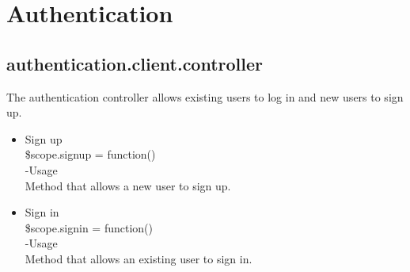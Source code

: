 \documentclass[a4paper,12pt]{article}
\begin{document}
\section{Authentication}
\subsection{authentication.client.controller}
The authentication controller allows existing users to log in and new users to sign up.
 \begin{itemize}
 \item Sign up \\
 \$scope.signup = function()\\
 -Usage\\
 Method that allows a new user to sign up.
 \item Sign in\\
  \$scope.signin = function()\\
 -Usage\\
 Method that allows an existing user to sign in.
 \end{itemize}
\end{document}
